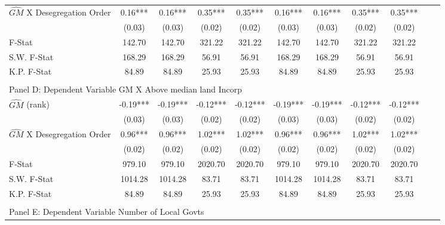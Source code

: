 \begin{table}[htbp]
\begin{threeparttable}
\begin{tabular}{l*{10}{c}}
\addlinespace
$\hat{GM}$ X Desegregation Order&       0.16***&       0.16***&       0.35***&       0.35***&       0.16***&       0.16***&       0.35***&       0.35***\\
                &     (0.03)   &     (0.03)   &     (0.02)   &     (0.02)   &     (0.03)   &     (0.03)   &     (0.02)   &     (0.02)   \\
\midrule
F-Stat          &     142.70   &     142.70   &     321.22   &     321.22   &     142.70   &     142.70   &     321.22   &     321.22   \\
S.W. F-Stat     &     168.29   &     168.29   &      56.91   &      56.91   &     168.29   &     168.29   &      56.91   &      56.91   \\
K.P. F-Stat     &      84.89   &      84.89   &      25.93   &      25.93   &      84.89   &      84.89   &      25.93   &      25.93   \\
\cmidrule[\heavyrulewidth](lr){1-9} \\ \cmidrule[\heavyrulewidth](lr){1-9}
\multicolumn{8}{l}{Panel D: Dependent Variable GM X Above median land Incorp}\\
\cmidrule(lr){1-9}
$\hat{GM}$ (rank)&      -0.19***&      -0.19***&      -0.12***&      -0.12***&      -0.19***&      -0.19***&      -0.12***&      -0.12***\\
                &     (0.03)   &     (0.03)   &     (0.02)   &     (0.02)   &     (0.03)   &     (0.03)   &     (0.02)   &     (0.02)   \\
\addlinespace
$\hat{GM}$ X Desegregation Order&       0.96***&       0.96***&       1.02***&       1.02***&       0.96***&       0.96***&       1.02***&       1.02***\\
                &     (0.02)   &     (0.02)   &     (0.02)   &     (0.02)   &     (0.02)   &     (0.02)   &     (0.02)   &     (0.02)   \\
\midrule
F-Stat          &     979.10   &     979.10   &    2020.70   &    2020.70   &     979.10   &     979.10   &    2020.70   &    2020.70   \\
S.W. F-Stat     &    1014.28   &    1014.28   &      83.71   &      83.71   &    1014.28   &    1014.28   &      83.71   &      83.71   \\
K.P. F-Stat     &      84.89   &      84.89   &      25.93   &      25.93   &      84.89   &      84.89   &      25.93   &      25.93   \\
\cmidrule[\heavyrulewidth](lr){1-9} \\ \cmidrule[\heavyrulewidth](lr){1-9}
\multicolumn{8}{l}{Panel E: Dependent Variable Number of Local Govts}\\

\end{tabular}
\end{threeparttable}
\end{table}
